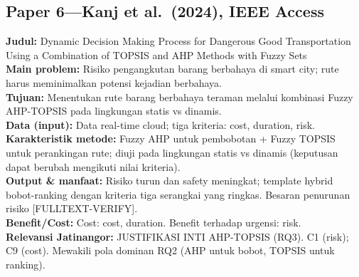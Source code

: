 \documentclass[a4paper,11pt]{article}
\begin{document}
\subsection*{Paper 6---Kanj et al.\ (2024), IEEE Access}
\textbf{Judul:} Dynamic Decision Making Process for Dangerous Good Transportation Using a Combination of TOPSIS and AHP Methods with Fuzzy Sets\\
\textbf{Main problem:} Risiko pengangkutan barang berbahaya di smart city; rute harus meminimalkan potensi kejadian berbahaya.\\
\textbf{Tujuan:} Menentukan rute barang berbahaya teraman melalui kombinasi Fuzzy AHP-TOPSIS pada lingkungan statis vs dinamis.\\
\textbf{Data (input):} Data real-time cloud; tiga kriteria: cost, duration, risk.\\
\textbf{Karakteristik metode:} Fuzzy AHP untuk pembobotan + Fuzzy TOPSIS untuk perankingan rute; diuji pada lingkungan statis vs dinamis (keputusan dapat berubah mengikuti nilai kriteria).\\
\textbf{Output \& manfaat:} Risiko turun dan safety meningkat; template hybrid bobot-ranking dengan kriteria tiga serangkai yang ringkas. Besaran penurunan risiko [FULLTEXT-VERIFY].\\
\textbf{Benefit/Cost:} Cost: cost, duration. Benefit terhadap urgensi: risk.\\
\textbf{Relevansi Jatinangor:} JUSTIFIKASI INTI AHP-TOPSIS (RQ3). C1 (risk); C9 (cost). Mewakili pola dominan RQ2 (AHP untuk bobot, TOPSIS untuk ranking).
\end{document}
